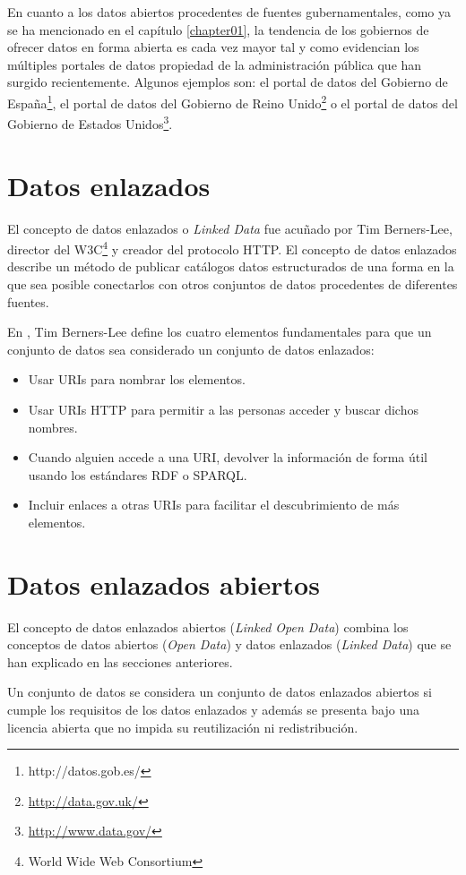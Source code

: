En cuanto a los datos abiertos procedentes de fuentes gubernamentales, como ya se ha mencionado en el capítulo \ref{chapter01}, la tendencia de los gobiernos de ofrecer datos en forma abierta es cada vez mayor tal y como evidencian los múltiples portales de datos propiedad de la administración pública que han surgido recientemente. Algunos ejemplos son: el portal de datos del Gobierno de España\footnote{http://datos.gob.es/}, el portal de datos del Gobierno de Reino Unido\footnote{\url{http://data.gov.uk/}} o el portal de datos del Gobierno de Estados Unidos\footnote{\url{http://www.data.gov/}}.



\section{Datos enlazados}
El concepto de datos enlazados o \textit{Linked Data} fue acuñado por Tim Berners-Lee, director del W3C\footnote{World Wide Web Consortium} y creador del protocolo HTTP. El concepto de datos enlazados describe un método de publicar catálogos datos estructurados de una forma en la que sea posible conectarlos con otros conjuntos de datos procedentes de diferentes fuentes.

En \cite{tbl-linkedopendata}, Tim Berners-Lee define los cuatro elementos fundamentales para que un conjunto de datos sea considerado un conjunto de datos enlazados:
\begin{itemize}
\item Usar URIs para nombrar los elementos.
\item Usar URIs HTTP para permitir a las personas acceder y buscar dichos nombres.
\item Cuando alguien accede a una URI, devolver la información de forma útil usando los estándares RDF o SPARQL.
\item Incluir enlaces a otras URIs para facilitar el descubrimiento de más elementos.
\end{itemize}



\section{Datos enlazados abiertos}
El concepto de datos enlazados abiertos (\textit{Linked Open Data}) combina los conceptos de datos abiertos (\textit{Open Data}) y datos enlazados (\textit{Linked Data}) que se han explicado en las secciones anteriores.

Un conjunto de datos se considera un conjunto de datos enlazados abiertos si cumple los requisitos de los datos enlazados y además se presenta bajo una licencia abierta que no impida su reutilización ni redistribución.


